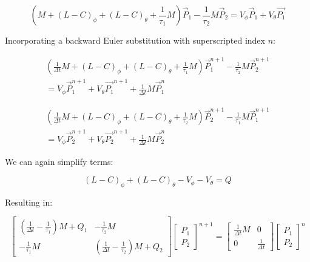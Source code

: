 \documentclass[12pt,a4paper,pagesize=pdftex]{scrartcl}
\begin{document}
\begin{equation*}
    \left(M + \left(L - C\right)_\phi + \left(L - C\right)_\theta + \frac{1}{\tau_1}M\right) \vec{P}_1 - \frac{1}{\tau_2}M \vec{P}_2 = V_\phi \vec{P}_1 + V_\theta \vec{P_1}
\end{equation*}

Incorporating a backward Euler substitution with superscripted index \(n\):

\begin{multline*}
    \left(\frac{1}{\Delta t} M + \left(L - C\right)_\phi + \left(L - C\right)_\theta + \frac{1}{\tau_1} M\right) \vec{P}_1^{n+1} - \frac{1}{\tau_2}M \vec{P}_2^{n+1} \\= V_\phi \vec{P}_1^{n+1} + V_\theta \vec{P_1}^{n+1} + \frac{1}{\Delta t} M \vec{P}_1^{n}
\end{multline*}

\begin{multline*}
    \left(\frac{1}{\Delta t} M + \left(L - C\right)_\phi + \left(L - C\right)_\theta + \frac{1}{\tau_2} M\right) \vec{P}_2^{n+1} - \frac{1}{\tau_1}M \vec{P}_1^{n+1} \\= V_\phi \vec{P}_2^{n+1} + V_\theta \vec{P_2}^{n+1} + \frac{1}{\Delta t} M \vec{P}_2^{n}
\end{multline*}

We can again simplify terms:

\begin{equation*}
    \left(L - C\right)_\phi + \left(L - C\right)_\theta - V_\phi - V_\theta = Q
\end{equation*}

Resulting in:

\begin{equation*}
    \begin{bmatrix}
        \left(\frac{1}{\Delta t} - \frac{1}{\tau_1}\right) M + Q_1 & -\frac{1}{\tau_2} M \\
        -\frac{1}{\tau_1}M & \left(\frac{1}{\Delta t} - \frac{1}{\tau_2}\right)M + Q_2
    \end{bmatrix}
    \begin{bmatrix}
        P_1 \\
        P_2
    \end{bmatrix}^{n+1}
    =
    \begin{bmatrix}
        \frac{1}{\Delta t} M & 0 \\
        0 & \frac{1}{\Delta t}
    \end{bmatrix}
    \begin{bmatrix}
        P_1 \\
        P_2
    \end{bmatrix}^n
\end{equation*}
\end{document}

